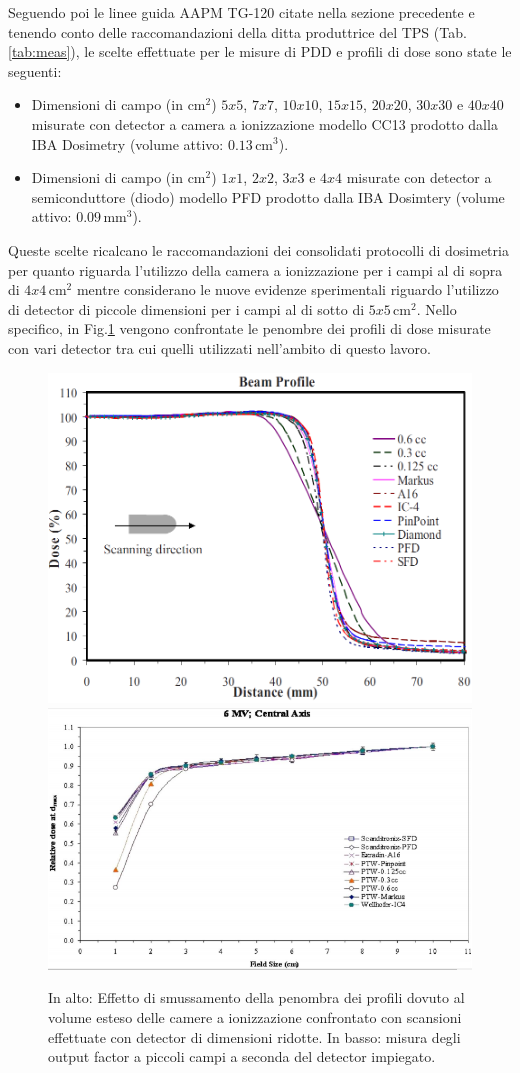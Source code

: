 Seguendo poi le linee guida AAPM TG-120 citate nella sezione precedente \cite{Low2011} e tenendo conto delle raccomandazioni della ditta produttrice del TPS (Tab.\ref{tab:meas}), le scelte effettuate per le misure di PDD e profili di dose sono state le seguenti:
\begin{itemize}
\item Dimensioni di campo (in cm$^2$) $5x5$, $7x7$, $10x10$, $15x15$, $20x20$, $30x30$ e $40x40$ misurate con detector a camera a ionizzazione modello CC13 prodotto dalla IBA Dosimetry (volume attivo: $0.13\,$cm$^3$).
\item Dimensioni di campo (in cm$^2$) $1x1$, $2x2$, $3x3$ e $4x4$ misurate con detector a semiconduttore (diodo) modello PFD prodotto dalla IBA Dosimtery (volume attivo: $0.09\,$mm$^3$).
\end{itemize}
Queste scelte ricalcano le raccomandazioni dei consolidati protocolli di dosimetria per quanto riguarda l'utilizzo della camera a ionizzazione per i campi al di sopra di $4x4\,$cm$^2$ mentre considerano le nuove evidenze sperimentali \cite{Das2008a,Low2011} riguardo l'utilizzo di detector di piccole dimensioni per i campi al di sotto di $5x5\,$cm$^2$. Nello specifico, in Fig.\ref{fig:pen_of} vengono confrontate le penombre dei profili di dose misurate con vari detector tra cui quelli utilizzati nell'ambito di questo lavoro.
\begin{figure}[!t]
\centering
\includegraphics[width=.75\textwidth]{./cap2/pen_smear.png}\\
\includegraphics[width=.75\textwidth]{./cap2/OF_uncert.png}
\caption{In alto: Effetto di smussamento della penombra dei profili dovuto al volume esteso delle camere a ionizzazione confrontato con scansioni effettuate con detector di dimensioni ridotte\cite{Das2008a}. In basso: misura degli output factor a piccoli campi a seconda del detector impiegato\cite{Das2008}.}
\label{fig:pen_of}
\end{figure}
